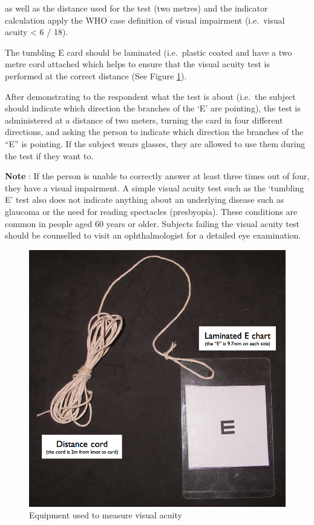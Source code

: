 \documentclass[12pt,a4paper]{book}
\theoremstyle{definition}
\theoremstyle{definition}
\theoremstyle{definition}
\theoremstyle{remark}
\begin{document}
as well as the distance used for the test (two metres) and the indicator
calculation apply the WHO case definition of visual impairment
(i.e.~visual acuity \textless{} 6 / 18).

The tumbling E card should be laminated (i.e.~plastic coated and have a
two metre cord attached which helps to ensure that the visual acuity
test is performed at the correct distance (See Figure
\ref{fig:indicators29}).

After demonstrating to the respondent what the test is about (i.e.~the
subject should indicate which direction the branches of the `E' are
pointing), the test is administered at a distance of two meters, turning
the card in four different directions, and asking the person to indicate
which direction the branches of the ``E'' is pointing. If the subject
wears glasses, they are allowed to use them during the test if they want
to.

\textbf{Note} : If the person is unable to correctly answer at least
three times out of four, they have a visual impairment. A simple visual
acuity test such as the `tumbling E' test also does not indicate
anything about an underlying disease such as glaucoma or the need for
reading spectacles (presbyopia). These conditions are common in people
aged 60 years or older. Subjects failing the visual acuity test should
be counselled to visit an ophthalmologist for a detailed eye
examination.

\newpage

\begin{figure}[H]

{\centering \includegraphics{figures/indicators29} 

}

\caption{Equipment used to measure visual acuity}\label{fig:indicators29}
\end{figure}\newpage
\end{document}
